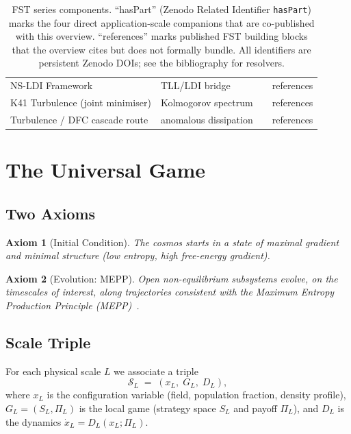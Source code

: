 \documentclass[11pt,a4paper]{article}
\newtheorem{axiom}{Axiom}
\theoremstyle{remark}
\begin{document}
\begin{table}[h]
\begin{tabularx}{\textwidth}{p{3.0cm}Y p{2.3cm}p{1.8cm}}
NS-LDI Framework                & TLL/LDI bridge          & \cite{GeigerNSLDI-2026}      & references \\
K41 Turbulence (joint minimiser)& Kolmogorov spectrum     & \cite{GeigerK41-2026}        & references \\
Turbulence / DFC cascade route  & anomalous dissipation   & \cite{GeigerTurbulence-2026} & references \\
\bottomrule
\end{tabularx}
\endgroup
\caption{FST series components. ``hasPart'' (Zenodo Related Identifier
\texttt{hasPart}) marks the four direct application-scale companions
that are co-published with this overview. ``references'' marks
published FST building blocks that the overview cites but does not
formally bundle. All identifiers are persistent Zenodo DOIs; see the
bibliography for resolvers.}
\label{tab:series-components}
\end{table}

\section{The Universal Game}
\label{sec:universal-game}

\subsection{Two Axioms}

\begin{axiom}[Initial Condition]
The cosmos starts in a state of maximal gradient and minimal structure
(low entropy, high free-energy gradient).
\end{axiom}

\begin{axiom}[Evolution: MEPP]
Open non-equilibrium subsystems evolve, on the timescales of interest,
along trajectories consistent with the Maximum Entropy Production
Principle (MEPP)~\cite{MartyushevSeleznev2006}.
\end{axiom}

\subsection{Scale Triple}

For each physical scale $L$ we associate a triple
\[
\mathcal{S}_L \;=\; (x_L,\; G_L,\; D_L),
\]
where $x_L$ is the configuration variable (field, population fraction,
density profile), $G_L = (S_L, \Pi_L)$ is the local game
(strategy space $S_L$ and payoff $\Pi_L$), and $D_L$ is the dynamics
$\dot{x}_L = D_L(x_L; \Pi_L)$.
\end{document}
